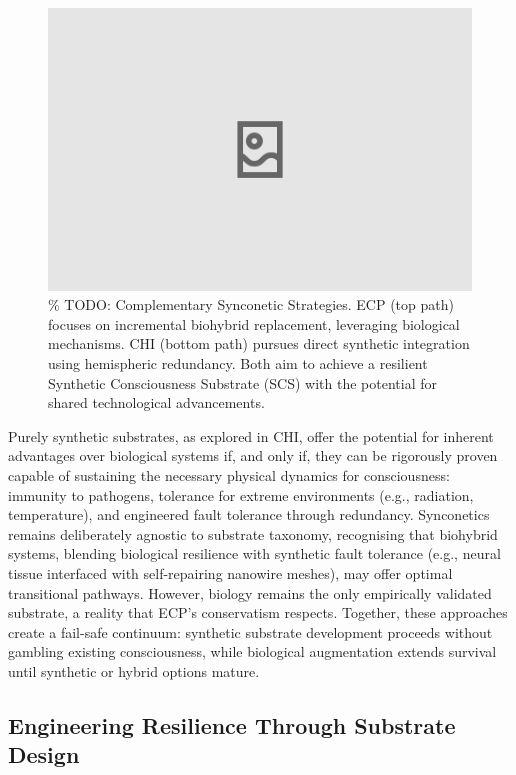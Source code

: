 \documentclass[10pt]{article}
\begin{document}
\begin{sloppypar}
  \begin{figure}[ht!]
    \centering
    \includegraphics[width=\textwidth]{figures/complementary-pathways.png}
    \caption{\% TODO: Complementary Synconetic Strategies. ECP (top path) focuses on incremental biohybrid replacement, leveraging biological mechanisms. CHI (bottom path) pursues direct synthetic integration using hemispheric redundancy. Both aim to achieve a resilient Synthetic Consciousness Substrate (SCS) with the potential for shared technological advancements.}
    \label{fig:complementary-pathways}
  \end{figure}

  Purely synthetic substrates, as explored in CHI, offer the potential for inherent advantages over biological systems if, and only if, they can be rigorously proven capable of sustaining the necessary physical dynamics for consciousness: immunity to pathogens, tolerance for extreme environments (e.g., radiation, temperature), and engineered fault tolerance through redundancy. Synconetics remains deliberately agnostic to substrate taxonomy, recognising that biohybrid systems, blending biological resilience with synthetic fault tolerance (e.g., neural tissue interfaced with self-repairing nanowire meshes), may offer optimal transitional pathways. However, biology remains the only empirically validated substrate, a reality that ECP’s conservatism respects. Together, these approaches create a fail-safe continuum: synthetic substrate development proceeds without gambling existing consciousness, while biological augmentation extends survival until synthetic or hybrid options mature.

  \subsection{Engineering Resilience Through Substrate Design}
  \label{sec:engineering-resilience}


\end{sloppypar}
\end{document}
